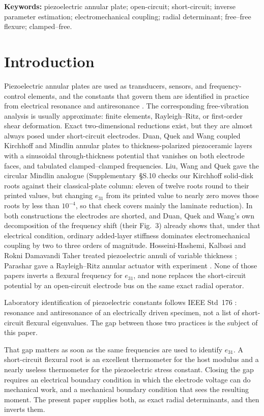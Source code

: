 \documentclass[11pt]{article}
\begin{document}
\noindent\textbf{Keywords:} piezoelectric annular plate; open-circuit;
short-circuit; inverse parameter estimation; electromechanical coupling;
radial determinant; free--free flexure; clamped--free.

\section{Introduction}\label{sec:intro}
Piezoelectric annular plates are used as transducers, sensors, and
frequency-control elements, and the constants that govern them are
identified in practice from electrical resonance and antiresonance
\cite{ieee176}. The corresponding free-vibration analysis is usually
approximate: finite elements, Rayleigh--Ritz, or first-order shear
deformation. Exact two-dimensional reductions exist, but they are
almost always posed under short-circuit electrodes. Duan, Quek and Wang
\cite{duan2005} coupled Kirchhoff and Mindlin annular plates to
thickness-polarized piezoceramic layers with a sinusoidal
through-thickness potential that vanishes on both electrode faces, and
tabulated clamped--clamped frequencies. Liu, Wang and Quek
\cite{liu2002} gave the circular Mindlin analogue (Supplementary~\S S.10
checks our Kirchhoff solid-disk roots against their
classical-plate column: eleven of twelve roots round to their printed
values, but changing $e_{31}$ from its printed value to nearly zero moves
those roots by less than $10^{-4}$, so that check covers mainly the
laminate reduction). In
both constructions
the electrodes are shorted, and Duan, Quek and Wang's own decomposition
of the frequency shift (their Fig.~3) already shows that, under that
electrical condition, ordinary added-layer stiffness dominates
electromechanical coupling by two to three orders of magnitude.
Hosseini-Hashemi, Kalbasi and Rokni Damavandi Taher treated piezoelectric
annuli of variable thickness \cite{hosseini2011}; Parashar gave a
Rayleigh--Ritz annular actuator with experiment \cite{parashar2013}.
None of those papers inverts a flexural frequency for $e_{31}$, and none
replaces the short-circuit potential by an open-circuit electrode bus on
the same exact radial operator.

Laboratory identification of piezoelectric constants follows IEEE Std~176
\cite{ieee176}: resonance and antiresonance of an electrically driven
specimen, not a list of short-circuit flexural eigenvalues. The gap
between those two practices is the subject of this paper.

That gap matters as soon as the same frequencies are used to identify
$e_{31}$. A short-circuit flexural root is an excellent thermometer for
the host modulus and a nearly useless thermometer for the piezoelectric
stress constant. Closing the gap requires an electrical boundary
condition in which the electrode voltage can do mechanical work, and a
mechanical boundary condition that sees the resulting moment. The
present paper supplies both, as exact radial determinants, and then
inverts them.
\end{document}
